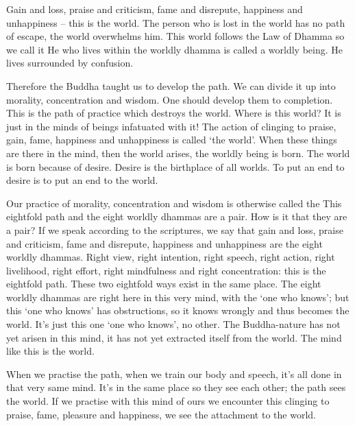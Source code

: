 Gain and loss, praise and criticism, fame and disrepute, happiness and unhappiness -- this is the world. The person who is lost in the world has no path of escape, the world overwhelms him. This world follows the Law of Dhamma so we call it  He who lives within the worldly dhamma is called a worldly being. He lives surrounded by confusion. 

Therefore the Buddha taught us to develop the path. We can divide it up into morality, concentration and wisdom. One should develop them to completion. This is the path of practice which destroys the world. Where is this world? It is just in the minds of beings infatuated with it! The action of clinging to praise, gain, fame, happiness and unhappiness is called `the world'. When these things are there in the mind, then the world arises, the worldly being is born. The world is born because of desire. Desire is the birthplace of all worlds. To put an end to desire is to put an end to the world. 

Our practice of morality, concentration and wisdom is otherwise called the  This eightfold path and the eight worldly dhammas are a pair. How is it that they are a pair? If we speak according to the scriptures, we say that gain and loss, praise and criticism, fame and disrepute, happiness and unhappiness are the eight worldly dhammas. Right view, right intention, right speech, right action, right livelihood, right effort, right mindfulness and right concentration: this is the eightfold path. These two eightfold ways exist in the same place. The eight worldly dhammas are right here in this very mind, with the `one who knows'; but this `one who knows' has obstructions, so it knows wrongly and thus becomes the world. It's just this one `one who knows', no other. The Buddha-nature has not yet arisen in this mind, it has not yet extracted itself from the world. The mind like this is the world. 

When we practise the path, when we train our body and speech, it's all done in that very same mind. It's in the same place so they see each other; the path sees the world. If we practise with this mind of ours we encounter this clinging to praise, fame, pleasure and happiness, we see the attachment to the world. 

